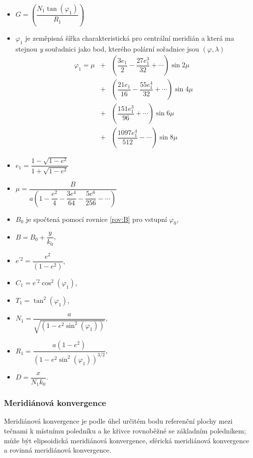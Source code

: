 \begin{itemize}
\item $G = \left(\dfrac{N_{1}\tan{\left(\varphi_{1}\right)}}{R_{1}}\right)$
\item $\varphi_{1}$ je zeměpisná šířka charakteristická pro centrální meridián a která ma stejnou \textit{y} souřadnici jako bod, kterého polární sořadnice jsou $\left(\varphi, \lambda\right)$ 
\begin{eqnarray} \nonumber
\varphi_{1} = \mu &+& \left( \dfrac{3e_{1}}{2} - \dfrac{27e_{1}^{3}}{32} + \cdots \right)\sin{2\mu} \\ \nonumber
                  &+& \left( \dfrac{21e_{1}}{16} - \dfrac{55e_{1}^{4}}{32} + \cdots \right)\sin{4\mu} \\ \nonumber
                  &+& \left( \dfrac{151e_{1}^{3}}{96} + \cdots \right)\sin{6\mu} \\ \nonumber
                  &+& \left( \dfrac{1097e_{1}^{4}}{512} - \cdots \right)\sin{8\mu} \nonumber
\end{eqnarray}
\item $
e_{1} = \dfrac{1 - \sqrt{1-e^{2}}}{1 + \sqrt{1-e^{2}}}
$
\item $\mu = \dfrac{B}{a\left(1-\dfrac{e^{2}}{4} - \dfrac{3e^{4}}{64} - \dfrac{5e^{6}}{256} - \cdots\right)} 
$
\item $B_{0}$ je spočtená pomocí rovnice \ref{rov:B} pro vstupní $\varphi_{0}$,
\item $B = B_{0} + \dfrac{y}{k_{0}}$,
\item $e^{'2} = \dfrac{e^{2}}{\left(1-e^{2}\right)}$,
\item $C_{1} = e^{'2}\cos^{2}{\left(\varphi_{1}\right)}$,
\item $T_{1} = \tan^{2}{\left(\varphi_{1}\right)}$,
\item $N_{1} = \dfrac{a}{\sqrt{\left(1-e^{2}\sin^{2}{\left(\varphi_{1}\right)}\right)}}$,
\item $R_{1} = \dfrac{a\left(1-e^{2}\right)}{\left(1-e^{2}\sin^{2}{\left(\varphi_{1}\right)}\right)^{3/2}}$,
\item $D = \dfrac{x}{N_{1}k_{0}}$.
\end{itemize}

\subsubsection*{Meridiánová konvergence}
Meridiánová konvergence je podle \cite{webVUGTK} úhel určitém bodu referenční plochy mezi tečnami k místnímu poledníku a ke křivce rovnoběžné se základním poledníkem; může být elipsoidická meridiánová konvergence, sférická meridiánová konvergence a rovinná meridiánová konvergence.

